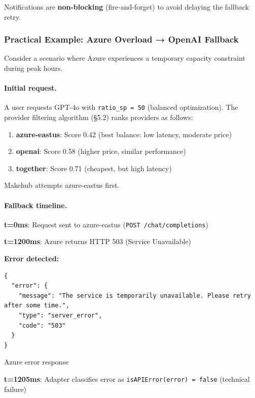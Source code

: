 \documentclass[english]{article}
\begin{document}
Notifications are \textbf{non-blocking} (fire-and-forget) to avoid delaying the fallback retry.

\subsubsection{Practical Example: Azure Overload → OpenAI Fallback}

Consider a scenario where Azure experiences a temporary capacity constraint during peak hours.

\paragraph{Initial request.}

A user requests GPT-4o with \texttt{ratio\_sp = 50} (balanced optimization). The provider filtering algorithm (§5.2) ranks providers as follows:

\begin{enumerate}
    \item \textbf{azure-eastus}: Score 0.42 (best balance: low latency, moderate price)
    \item \textbf{openai}: Score 0.58 (higher price, similar performance)
    \item \textbf{together}: Score 0.71 (cheapest, but high latency)
\end{enumerate}

Makehub attempts azure-eastus first.

\paragraph{Fallback timeline.}

\textbf{t=0ms}: Request sent to azure-eastus (\texttt{POST /chat/completions})

\textbf{t=1200ms}: Azure returns HTTP 503 (Service Unavailable)

\textbf{Error detected:}
\begin{listing}[H]
\begin{verbatim}
{
  "error": {
    "message": "The service is temporarily unavailable. Please retry after some time.",
    "type": "server_error",
    "code": "503"
  }
}
\end{verbatim}
\caption{Azure error response}
\end{listing}

\textbf{t=1205ms}: Adapter classifies error as \texttt{isAPIError(error) = false} (technical failure)
\end{document}
